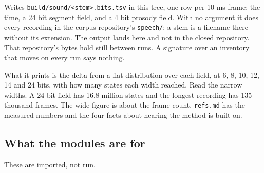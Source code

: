 Writes \texttt{build/\allowbreak{}sound/\allowbreak{}<stem>.\allowbreak{}bits.\allowbreak{}tsv} in this tree, one row per 10 ms frame: the time, a 24 bit segment field, and a 4 bit prosody field. With no argument it does every recording in the corpus repository's \texttt{speech/\allowbreak{}}; a stem is a filename there without its extension. The output lands here and not in the closed repository. That repository's bytes hold still between runs. A signature over an inventory that moves on every run says nothing.

What it prints is the delta from a flat distribution over each field, at 6, 8, 10, 12, 14 and 24 bits, with how many states each width reached. Read the narrow widths. A 24 bit field has 16.8 million states and the longest recording has 135 thousand frames. The wide figure is about the frame count. \texttt{refs.\allowbreak{}md} has the measured numbers and the four facts about hearing the method is built on.

\subsection{What the modules are for}

These are imported, not run.

